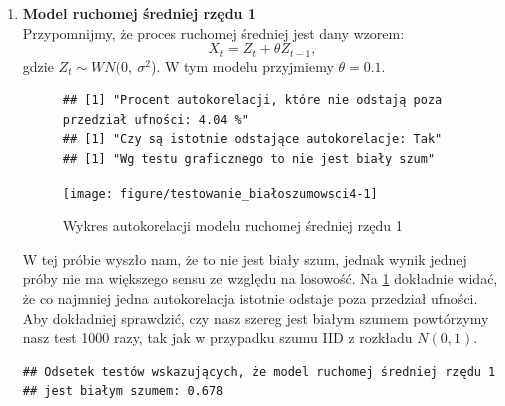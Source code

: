 \documentclass[10pt, a4paper]{article}\usepackage[]{graphicx}\usepackage[]{xcolor}
\makeatletter
\newenvironment{kframe}{%
 \def\at@end@of@kframe{}%
 \ifinner\ifhmode%
  \def\at@end@of@kframe{\end{minipage}}%
  \begin{minipage}{\columnwidth}%
 \fi\fi%
 \def\FrameCommand##1{\hskip\@totalleftmargin \hskip-\fboxsep
 \colorbox{shadecolor}{##1}\hskip-\fboxsep
     \hskip-\linewidth \hskip-\@totalleftmargin \hskip\columnwidth}%
 \MakeFramed {\advance\hsize-\width
   \@totalleftmargin\z@ \linewidth\hsize
   \@setminipage}}%
 {\par\unskip\endMakeFramed%
 \at@end@of@kframe}
\newenvironment{knitrout}{}{} %
\makeatother
\begin{document}
\begin{enumerate}
\item \label{1} \textbf{Model ruchomej średniej rzędu 1} \\
Przypomnijmy, że proces ruchomej średniej jest dany wzorem:
$$X_t=Z_t+\theta Z_{t-1},$$
gdzie $Z_t\sim WN(0,~\sigma^2$). W tym modelu przyjmiemy $\theta=0.1$.
\begin{figure}[H]
\begin{knitrout}
\color{fgcolor}\begin{kframe}
\begin{verbatim}
## [1] "Procent autokorelacji, które nie odstają poza przedział ufności: 4.04 %"
## [1] "Czy są istotnie odstające autokorelacje: Tak"
## [1] "Wg testu graficznego to nie jest biały szum"
\end{verbatim}
\end{kframe}

{\centering \texttt{[image: figure/testowanie\_białoszumowsci4-1]} 

}


\end{knitrout}
\caption{Wykres autokorelacji modelu ruchomej średniej rzędu 1}
\label{graph2}
\end{figure}
W tej próbie wyszło nam, że to nie jest biały szum, jednak wynik jednej próby nie ma większego sensu ze względu na losowość. Na \ref{graph2} dokładnie widać, że co najmniej jedna autokorelacja istotnie odstaje poza przedział ufności. Aby dokładniej sprawdzić, czy nasz szereg jest białym szumem powtórzymy nasz test 1000 razy, tak jak w przypadku szumu IID z rozkładu $N(0,1)$.
\begin{knitrout}
\color{fgcolor}\begin{kframe}
\begin{verbatim}
## Odsetek testów wskazujących, że model ruchomej średniej rzędu 1
## jest białym szumem: 0.678
\end{verbatim}
\end{kframe}
\end{knitrout}


\end{enumerate}
\end{document}
